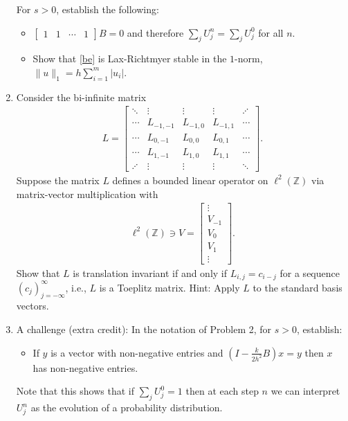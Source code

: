 \documentclass[10pt]{amsart}
\begin{document}
\begin{enumerate}[label={\bf Problem~{\arabic*}:}]
  
      \noindent For $s > 0$, establish the following:
       \begin{itemize}
       \item $\begin{bmatrix} 1 & 1 & \cdots & 1 \end{bmatrix} B = 0$ and therefore $\sum_j U_j^n = \sum_j U_j^0$ for all $n$.
         \item  Show that \eqref{be} is Lax-Richtmyer stable in the $1$-norm, $\|u\|_1 = h \sum_{i=1}^m |u_i|$.
    \end{itemize}
     
    \mline
    \item Consider the bi-infinite matrix
    \begin{align*}
      L = \begin{bmatrix}
        \ddots & \vdots & \vdots & \vdots  & \iddots \\
        \cdots & L_{-1,-1} & L_{-1,0} & L_{-1,1} & \cdots \\
        \cdots & L_{0,-1} & L_{0,0} & L_{0,1} & \cdots \\
        \cdots & L_{1,-1} & L_{1,0} & L_{1,1} & \cdots \\
        \iddots & \vdots & \vdots & \vdots & \ddots
      \end{bmatrix}.                
    \end{align*}
    Suppose the matrix $L$ defines a bounded linear operator on $\ell^2(\mathbb Z)$ via matrix-vector multiplication with
    \begin{align*}
     \ell^2(\mathbb Z) \ni V = \begin{bmatrix} \vdots \\ V_{-1} \\ V_0 \\ V_1 \\\vdots \end{bmatrix}.
    \end{align*}
    Show that $L$ is translation invariant if and only if $L_{i,j} = c_{i - j}$ for a sequence $(c_j)_{j=-\infty}^\infty$, i.e., $L$ is a Toeplitz matrix.  Hint: Apply $L$ to the standard basis vectors.

    
\mline 
  
\item A challenge (extra credit):  In the notation of Problem 2, for $s > 0$, establish:
  \begin{itemize}
  \item If $y$ is a vector with non-negative entries and $\left( I - \frac{k}{2h^2}B \right) x = y$ then $x$ has non-negative entries.
  \end{itemize}
  Note that this shows that if $\sum_j U_j^0 =1$ then at each step $n$ we can interpret $U_j^n$ as the evolution of a probability distribution.
  
  \end{enumerate}
\end{document}
